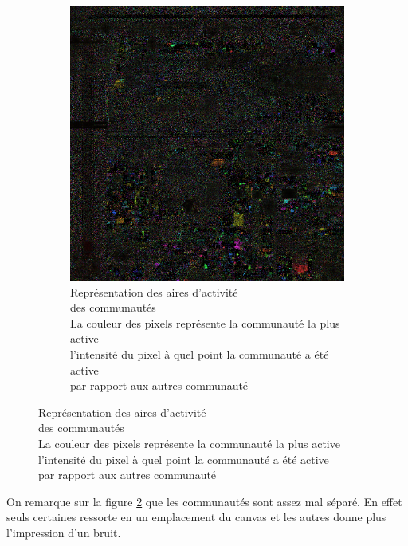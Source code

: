 \documentclass[a4paper]{article}
\begin{document}
{\begin{figure}[h]
\begin{subfigure}{.4\linewidth}
        \includegraphics[width=\linewidth]{summary_enemies.png}
        \caption{Représentation des aires d'activité\\ des communautés\\ \tiny La couleur des pixels représente la communauté la plus active \\l'intensité du pixel à quel point la communauté a été active \\ par rapport aux autres communauté}
        \label{fig:summary_enemies}
    \end{subfigure}
\end{figure}

On remarque sur la figure \ref{fig:summary_enemies} que les communautés sont assez mal séparé. En effet seuls certaines ressorte en un emplacement du canvas et les autres donne plus l'impression d'un bruit.

}
\end{document}
